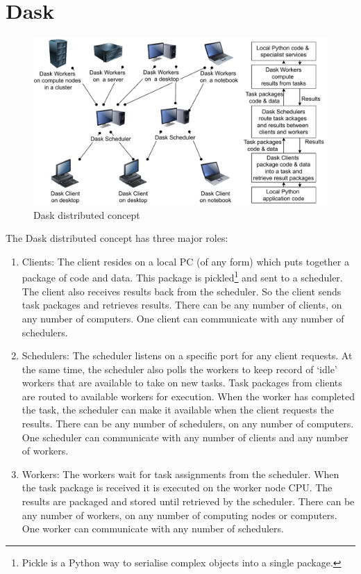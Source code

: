 \section{Dask }



\begin{figure}[htbp]
    \centering
\includegraphics[width=\textwidth]{pic/dask-scheduler}
    \caption{Dask distributed concept}
    \label{fig:dask-scheduler}
\end{figure}

The Dask distributed concept has three major roles:
\begin{enumerate}
    \item Clients: The client resides on a local PC (of any form) which puts together a package of code and data. This package is pickled\footnote{Pickle is a Python way to serialise complex objects into a single package.} and sent to a scheduler.  The client also receives results back from the scheduler. So the client sends task packages and retrieves results.  There can be any number of clients, on any number of computers. One client can communicate with any number of schedulers.

    \item Schedulers: The scheduler listens on a specific port for any client requests. At the same time, the scheduler also polls the workers to keep record of `idle' workers that are available to take on new tasks.  Task packages from clients are routed to available workers for execution. When the worker has completed the task, the scheduler can make it available when the client requests the results. There can be any number of schedulers, on any number of computers. One scheduler can communicate with any number of clients and any number of workers.

    \item Workers: The workers wait for task assignments from the scheduler. When the task package is received it is executed on the worker node CPU. The results are packaged and stored until retrieved by the scheduler.   There can be any number of workers, on any number of computing nodes or computers. One worker can communicate with any number of schedulers.
\end{enumerate}



